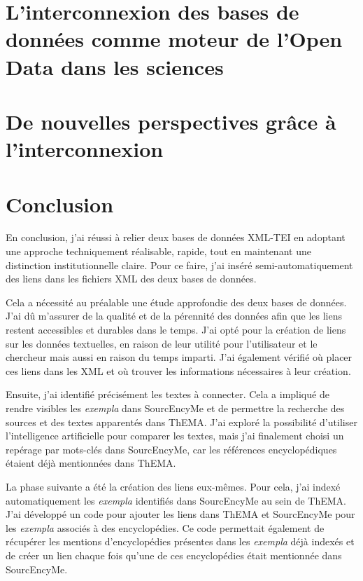 \documentclass[a4paper,12pt,twoside]{book} %
\begin{document}
\chapter{L'interconnexion des bases de données comme moteur de l'Open Data dans les sciences}	


\chapter{De nouvelles perspectives grâce à l'interconnexion}

	
	\chapter*{Conclusion}
En conclusion, j'ai réussi à relier deux bases de données XML-TEI en adoptant une approche techniquement réalisable, rapide, tout en maintenant une distinction institutionnelle claire. Pour ce faire, j'ai inséré semi-automatiquement des liens dans les fichiers XML des deux bases de données.

Cela a nécessité au préalable une étude approfondie des deux bases de données. J'ai dû m'assurer de la qualité et de la pérennité des données afin que les liens restent accessibles et durables dans le temps. J'ai opté pour la création de liens sur les données textuelles, en raison de leur utilité pour l'utilisateur et le chercheur mais aussi en raison du temps imparti. J'ai également vérifié où placer ces liens dans les XML et où trouver les informations nécessaires à leur création.

Ensuite, j'ai identifié précisément les textes à connecter. Cela a impliqué de rendre visibles les \textit{exempla} dans SourcEncyMe et de permettre la recherche des sources et des textes apparentés dans ThEMA. J'ai exploré la possibilité d'utiliser l'intelligence artificielle pour comparer les textes, mais j'ai finalement choisi un repérage par mots-clés dans SourcEncyMe, car les références encyclopédiques étaient déjà mentionnées dans ThEMA.

La phase suivante a été la création des liens eux-mêmes. Pour cela, j'ai indexé automatiquement les \textit{exempla} identifiés dans SourcEncyMe au sein de ThEMA. J'ai développé un code pour ajouter les liens dans ThEMA et SourcEncyMe pour les \textit{exempla} associés à des encyclopédies. Ce code permettait également de récupérer les mentions d'encyclopédies présentes dans les \textit{exempla} déjà indexés et de créer un lien chaque fois qu'une de ces encyclopédies était mentionnée dans SourcEncyMe.
\end{document}
